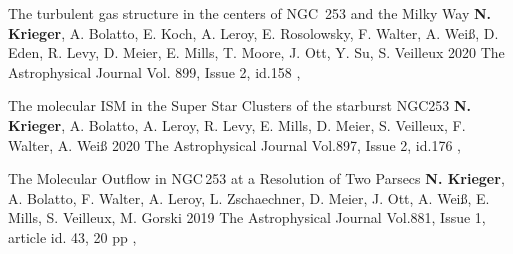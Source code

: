 \documentclass[%
               doublesided,
               paper=a4,
               fontsize=10pt
              ]{my-resume}
\begin{document}
\publication
	{The turbulent gas structure in the centers of NGC~253 and the Milky Way} %
	{\textbf{N. Krieger}, A. Bolatto, E. Koch, A. Leroy, E. Rosolowsky, F. Walter, A. Wei\ss, D. Eden, R. Levy, D. Meier, E. Mills, T. Moore, J. Ott, Y. Su, S. Veilleux} %
	{2020} %
	{The Astrophysical Journal Vol. 899, Issue 2, id.158} %
	{, } %

\publication
	{The molecular ISM in the Super Star Clusters of the starburst NGC253} %
	{\textbf{N. Krieger}, A. Bolatto, A. Leroy, R. Levy, E. Mills, D. Meier, S. Veilleux, F. Walter, A. Wei\ss} %
	{2020} %
	{The Astrophysical Journal Vol.897, Issue 2, id.176} %
	{, } %

\publication
	{The Molecular Outflow in NGC\,253 at a Resolution of Two Parsecs} %
	{\textbf{N. Krieger}, A. Bolatto, F. Walter, A. Leroy, L. Zschaechner, D. Meier, J. Ott, A. Wei\ss, E. Mills, S. Veilleux, M. Gorski} %
	{2019} %
	{The Astrophysical Journal Vol.881, Issue 1, article id. 43, 20 pp} %
	{, } %
\end{document}
